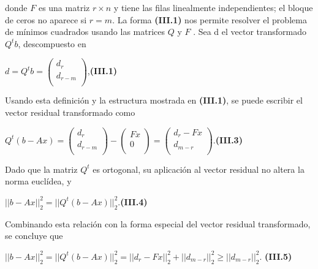 \documentclass[twocolumn,twoside]{article}
\begin{document}
donde $F$ es una matriz $r\times n$ y tiene las filas linealmente independientes; el bloque de
ceros no aparece si $r = m$.
La forma \textbf{(III.1)} nos permite resolver el problema de m\'inimos cuadrados usando las
matrices $Q$ y $F$ . Sea d el vector transformado $Q^{t} b$, descompuesto en
\begin{center}
  $d = Q^t b = \left(\begin{array}{c}
    d_r\\ 
    d_{r-m}\\
   \end{array}\right)$,\hspace{1cm}\textbf{(III.1)}
\end{center}
Usando esta definici\'on y la estructura mostrada en \textbf{(III.1)}, se puede escribir el vector
residual transformado como

\begin{center}
  $Q^t(b - A x) = \left(\begin{array}{c}
    d_r\\ 
    d_{r-m}\\
   \end{array}\right)-
   \left(\begin{array}{c}
    Fx\\ 
    0\\
   \end{array}\right)=
   \left(\begin{array}{c}
    d_r-Fx\\ 
    d_{m-r}\\
   \end{array}\right)
   $.\hspace{3cm}\textbf{(III.3)}
\end{center}

Dado que la matriz $Q^{t}$ es ortogonal, su aplicaci\'on al vector residual no altera la norma
eucl\'idea, y
\begin{center}
  $||b - A x||_2^2 = ||Q^t (b - A x)||_2^2 $.\hspace{1.5cm}\textbf{(III.4)}
\end{center}

Combinando esta relaci\'on con la forma especial del vector residual transformado, se concluye que

\begin{center}
  $||b - A x||_2^2 = ||Q^t (b - A x)||_2^2 = ||d_r - F x||_2^2 + ||d_{m-r} ||_2^2 \geq ||d_{m-r} ||_2^2  $.
  \textbf{(III.5)}
\end{center}
\end{document}
